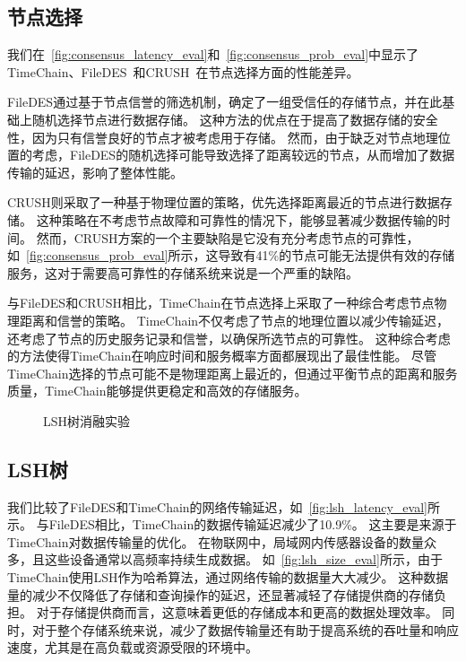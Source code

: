 \subsection{节点选择}
我们在~\autoref{fig:consensus_latency_eval}和~\autoref{fig:consensus_prob_eval}中显示了TimeChain、FileDES~\cite{xu2024filedes}和CRUSH~\cite{weil2006ceph}在节点选择方面的性能差异。

FileDES通过基于节点信誉的筛选机制，确定了一组受信任的存储节点，并在此基础上随机选择节点进行数据存储。
这种方法的优点在于提高了数据存储的安全性，因为只有信誉良好的节点才被考虑用于存储。
然而，由于缺乏对节点地理位置的考虑，FileDES的随机选择可能导致选择了距离较远的节点，从而增加了数据传输的延迟，影响了整体性能。

CRUSH则采取了一种基于物理位置的策略，优先选择距离最近的节点进行数据存储。
这种策略在不考虑节点故障和可靠性的情况下，能够显著减少数据传输的时间。
然而，CRUSH方案的一个主要缺陷是它没有充分考虑节点的可靠性，如~\autoref{fig:consensus_prob_eval}所示，这导致有41\%的节点可能无法提供有效的存储服务，这对于需要高可靠性的存储系统来说是一个严重的缺陷。

与FileDES和CRUSH相比，TimeChain在节点选择上采取了一种综合考虑节点物理距离和信誉的策略。
TimeChain不仅考虑了节点的地理位置以减少传输延迟，还考虑了节点的历史服务记录和信誉，以确保所选节点的可靠性。
这种综合考虑的方法使得TimeChain在响应时间和服务概率方面都展现出了最佳性能。
尽管TimeChain选择的节点可能不是物理距离上最近的，但通过平衡节点的距离和服务质量，TimeChain能够提供更稳定和高效的存储服务。

\begin{figure*}[t]
    \centering
    \begin{minipage}{0.96\linewidth}
        \vspace{-0.5ex}
        \caption{LSH树消融实验} 
    \end{minipage}
\end{figure*}

\subsection{LSH树}
我们比较了FileDES和TimeChain的网络传输延迟，如~\autoref{fig:lsh_latency_eval}所示。
与FileDES相比，TimeChain的数据传输延迟减少了10.9\%。
这主要是来源于TimeChain对数据传输量的优化。
在物联网中，局域网内传感器设备的数量众多，且这些设备通常以高频率持续生成数据。
如~\autoref{fig:lsh_size_eval}所示，由于TimeChain使用LSH作为哈希算法，通过网络传输的数据量大大减少。
这种数据量的减少不仅降低了存储和查询操作的延迟，还显著减轻了存储提供商的存储负担。
对于存储提供商而言，这意味着更低的存储成本和更高的数据处理效率。
同时，对于整个存储系统来说，减少了数据传输量还有助于提高系统的吞吐量和响应速度，尤其是在高负载或资源受限的环境中。

